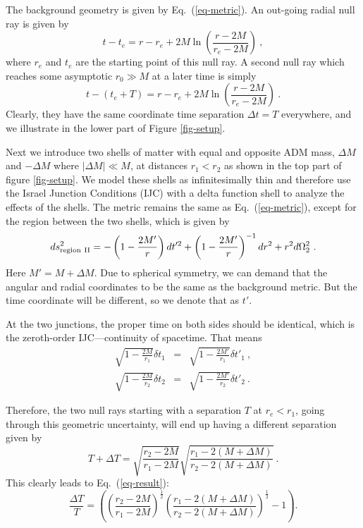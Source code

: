 \documentclass[aps,showpacs,onecolumn,floats,prd,superscriptaddress,nofootinbib]{revtex4-1}
\begin{document}
The background geometry is given by Eq.~(\ref{eq-metric}).
An out-going radial null ray is given by
\begin{equation}
	t - t_e = r - r_e + 2M \ln \left( \frac{r - 2M}{r_e - 2M}  \right)~,
	\label{3}
\end{equation}
where $r_e$ and $t_e$ are the starting point of this null ray.
A second null ray which reaches some asymptotic $r_0\gg M$ at a later time is simply
\begin{equation}
	t - (t_e + T) = r - r_e + 2M \ln \left( \frac{r - 2M}{r_e - 2M}  \right)~.
\end{equation}
Clearly, they have the same coordinate time separation $\Delta t = T$ everywhere, and we illustrate in the lower part of Figure \ref{fig-setup}.

Next we introduce two shells of matter with equal and opposite ADM mass, $\Delta M$ and $-\Delta M$ where $|\Delta M| \ll M$, at distances $r_1 < r_2$ as shown in the top part of figure \ref{fig-setup}. 
We model these shells as infinitesimally thin and therefore use the Israel Junction Conditions (IJC) \cite{Isr66} with a delta function shell to analyze the effects of the shells. 
The metric remains the same as Eq.~(\ref{eq-metric}), except for the region between the two shells, which is given by
\begin{equation}
	ds^2_{\rm region \ II} = - \left( 1 - \frac{2M'}{r} \right) d t'^2 + \left( 1 - \frac{2M'}{r} \right)^{-1} dr^2 + r^2 d \Omega_2^2~.	\label{2}
\end{equation}
Here $M' = M + \Delta M$. 
Due to spherical symmetry, we can demand that the angular and radial coordinates to be the same as the background metric. 
But the time coordinate will be different, so we denote that as $t'$.

At the two junctions, the proper time on both sides should be identical, which is the zeroth-order IJC---continuity of spacetime.
That means
\begin{eqnarray}
	\sqrt{1-\frac{2M}{r_1}} \delta t_1 &=& \sqrt{1-\frac{2M'}{r_1}} \delta t'_1~, \\
         \sqrt{1-\frac{2M}{r_2}} \delta t_2 &=& \sqrt{1-\frac{2M'}{r_2}} \delta t'_2~.
\end{eqnarray}

Therefore, the two null rays starting with a separation $T$ at $r_e<r_1$, going through this geometric uncertainty, will end up having a different separation given by
\begin{equation}
T+\Delta T = \sqrt{\frac{r_2-2M}{r_1-2M}} \sqrt{\frac{r_1-2(M+\Delta M)}{r_2-2(M+\Delta M)}}~.
\end{equation}
This clearly leads to Eq.~(\ref{eq-result}):
\begin{equation}
	\frac{\Delta T}{T} 
	= \left( \left( \frac{r_2 - 2M}{r_1 - 2M} \right)^\frac{1}{2} \left( \frac{r_1 - 2(M+\Delta M)}{r_2 - 2(M+\Delta M)} \right)^\frac{1}{2} - 1\right).	\label{10}
\end{equation}
\end{document}
